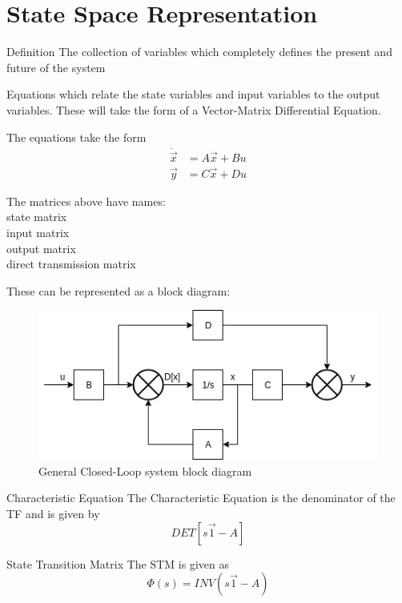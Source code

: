 \documentclass{../templates/topic}
\begin{document}
\graphicspath{{assets/}{ch2b_State_Space_Representation/assets/}}

\chapter{State Space Representation}

\begin{section}{Definition}
	 The collection of variables which completely defines the present and future of the system
	
	 Equations which relate the state variables and input variables to the output variables. These will take the form of a Vector-Matrix Differential Equation.
	
	The equations take the form
	\begin{align}
		\dot{\vec{x}}&= A\vec{x}+Bu\\
		\vec{y}&= C\vec{x} + Du
	\end{align}
	
	The matrices above have names:\\
	 state matrix \\
	 input matrix \\
	 output matrix \\
	 direct transmission matrix
	
	These can be represented as a block diagram:
	
	\begin{figure}[H]
		\includegraphics[width=\textwidth]{state_space_block_diagram.png}
		\caption{General Closed-Loop system block diagram}
	\end{figure}
	
	
\end{section}

\begin{section}{Characteristic Equation}
	The Characteristic Equation is the denominator of the TF and is given by
	\begin{equation}
		DET[s\vec1-A]
	\end{equation}
\end{section}

\begin{section}{State Transition Matrix}
	The STM is given as
	\begin{equation}
		\Phi(s)=INV(s\vec{1}-A)
	\end{equation}
\end{section}
\end{document}
